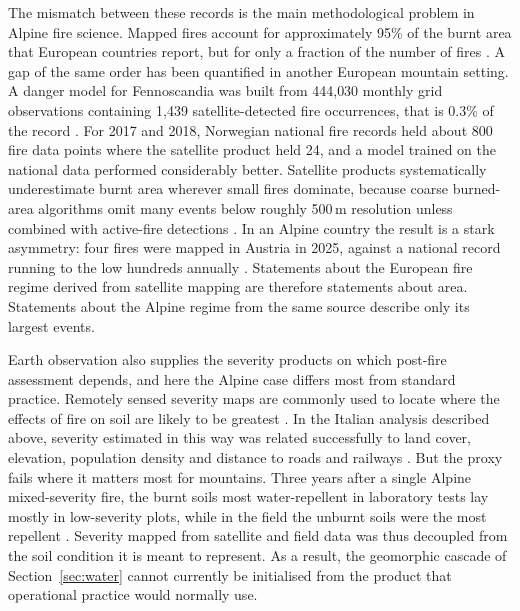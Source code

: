 \documentclass[11pt,a4paper]{article}
\begin{document}
The mismatch between these records is the main methodological problem in Alpine fire science. Mapped fires account for approximately 95\% of the burnt area that European countries report, but for only a fraction of the number of fires \citep{jrc_advance_2026}. A gap of the same order has been quantified in another European mountain setting. A danger model for Fennoscandia was built from 444{,}030 monthly grid observations containing 1{,}439 satellite-detected fire occurrences, that is 0.3\% of the record \citep{bakke_datadriven_2023}. For 2017 and 2018, Norwegian national fire records held about 800 fire data points where the satellite product held 24, and a model trained on the national data performed considerably better. Satellite products systematically underestimate burnt area wherever small fires dominate, because coarse burned-area algorithms omit many events below roughly 500\,m resolution unless combined with active-fire detections \citep{jones_global_2022, bakke_datadriven_2023}. In an Alpine country the result is a stark asymmetry: four fires were mapped in Austria in 2025, against a national record running to the low hundreds annually \citep{jrc_advance_2026, papathomakohle_towards_2025}. Statements about the European fire regime derived from satellite mapping are therefore statements about area. Statements about the Alpine regime from the same source describe only its largest events.

Earth observation also supplies the severity products on which post-fire assessment depends, and here the Alpine case differs most from standard practice. Remotely sensed severity maps are commonly used to locate where the effects of fire on soil are likely to be greatest \citep{negri_wildfire_2026}. In the Italian analysis described above, severity estimated in this way was related successfully to land cover, elevation, population density and distance to roads and railways \citep{malandra_burn_2022}. But the proxy fails where it matters most for mountains. Three years after a single Alpine mixed-severity fire, the burnt soils most water-repellent in laboratory tests lay mostly in low-severity plots, while in the field the unburnt soils were the most repellent \citep{negri_wildfire_2026}. Severity mapped from satellite and field data was thus decoupled from the soil condition it is meant to represent. As a result, the geomorphic cascade of Section~\ref{sec:water} cannot currently be initialised from the product that operational practice would normally use.
\end{document}
